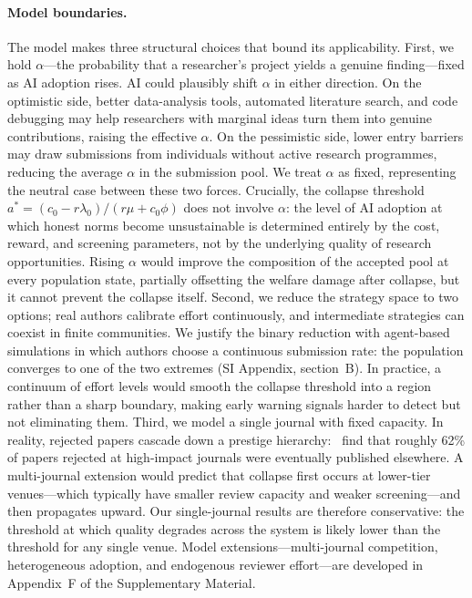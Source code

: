 \documentclass{article}
\begin{document}
\paragraph{Model boundaries.}
The model makes three structural choices that bound its applicability.
First, we hold $\alpha$---the probability that a researcher's project yields a genuine finding---fixed as AI adoption rises.
AI could plausibly shift $\alpha$ in either direction.
On the optimistic side, better data-analysis tools, automated literature search, and code debugging may help researchers with marginal ideas turn them into genuine contributions, raising the effective $\alpha$.
On the pessimistic side, lower entry barriers may draw submissions from individuals without active research programmes, reducing the average $\alpha$ in the submission pool.
We treat $\alpha$ as fixed, representing the neutral case between these two forces.
Crucially, the collapse threshold $a^* = (c_0 - r\lambda_0)/(r\mu + c_0\phi)$ does not involve $\alpha$: the level of AI adoption at which honest norms become unsustainable is determined entirely by the cost, reward, and screening parameters, not by the underlying quality of research opportunities.
Rising $\alpha$ would improve the composition of the accepted pool at every population state, partially offsetting the welfare damage after collapse, but it cannot prevent the collapse itself.
Second, we reduce the strategy space to two options; real authors calibrate effort continuously, and intermediate strategies can coexist in finite communities.
We justify the binary reduction with agent-based simulations in which authors choose a continuous submission rate: the population converges to one of the two extremes (SI Appendix, section~B).
In practice, a continuum of effort levels would smooth the collapse threshold into a region rather than a sharp boundary, making early warning signals harder to detect but not eliminating them.
Third, we model a single journal with fixed capacity.
In reality, rejected papers cascade down a prestige hierarchy:~\citet{Siler2015} find that roughly 62\% of papers rejected at high-impact journals were eventually published elsewhere.
A multi-journal extension would predict that collapse first occurs at lower-tier venues---which typically have smaller review capacity and weaker screening---and then propagates upward.
Our single-journal results are therefore conservative: the threshold at which quality degrades across the system is likely lower than the threshold for any single venue.
Model extensions---multi-journal competition, heterogeneous adoption, and endogenous reviewer effort---are developed in Appendix~F of the Supplementary Material.
\end{document}
